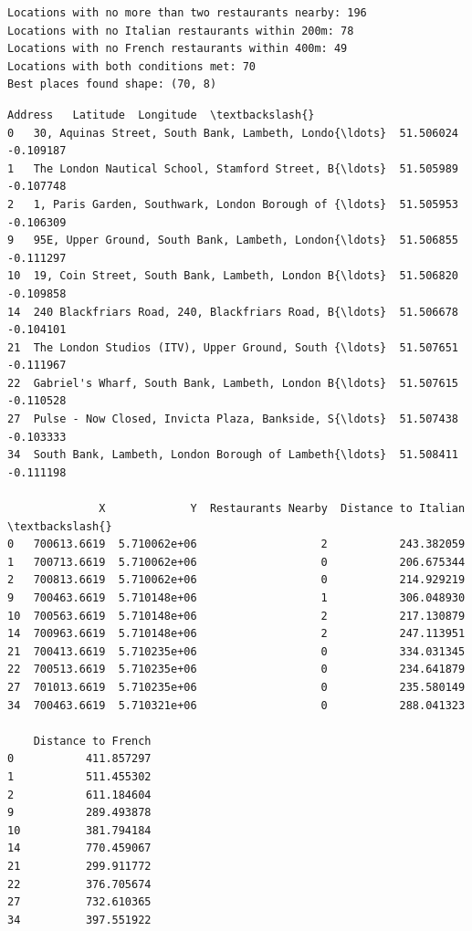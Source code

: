 \documentclass[11pt]{article}
\makeatletter
\newcommand{\boxspacing}{\kern\kvtcb@left@rule\kern\kvtcb@boxsep}
\newcommand{\prompt}[4]{
        \ttfamily\llap{{\color{#2}[#3]:\hspace{3pt}#4}}\vspace{-\baselineskip}
    }
\makeatother
\begin{document}
    \begin{Verbatim}[commandchars=\\\{\}]
Locations with no more than two restaurants nearby: 196
Locations with no Italian restaurants within 200m: 78
Locations with no French restaurants within 400m: 49
Locations with both conditions met: 70
Best places found shape: (70, 8)
    \end{Verbatim}

            \begin{tcolorbox}[breakable, size=fbox, boxrule=.5pt, pad at break*=1mm, opacityfill=0]
\prompt{Out}{outcolor}{93}{\boxspacing}
\begin{Verbatim}[commandchars=\\\{\}]
                                              Address   Latitude  Longitude  \textbackslash{}
0   30, Aquinas Street, South Bank, Lambeth, Londo{\ldots}  51.506024  -0.109187
1   The London Nautical School, Stamford Street, B{\ldots}  51.505989  -0.107748
2   1, Paris Garden, Southwark, London Borough of {\ldots}  51.505953  -0.106309
9   95E, Upper Ground, South Bank, Lambeth, London{\ldots}  51.506855  -0.111297
10  19, Coin Street, South Bank, Lambeth, London B{\ldots}  51.506820  -0.109858
14  240 Blackfriars Road, 240, Blackfriars Road, B{\ldots}  51.506678  -0.104101
21  The London Studios (ITV), Upper Ground, South {\ldots}  51.507651  -0.111967
22  Gabriel's Wharf, South Bank, Lambeth, London B{\ldots}  51.507615  -0.110528
27  Pulse - Now Closed, Invicta Plaza, Bankside, S{\ldots}  51.507438  -0.103333
34  South Bank, Lambeth, London Borough of Lambeth{\ldots}  51.508411  -0.111198

              X             Y  Restaurants Nearby  Distance to Italian  \textbackslash{}
0   700613.6619  5.710062e+06                   2           243.382059
1   700713.6619  5.710062e+06                   0           206.675344
2   700813.6619  5.710062e+06                   0           214.929219
9   700463.6619  5.710148e+06                   1           306.048930
10  700563.6619  5.710148e+06                   2           217.130879
14  700963.6619  5.710148e+06                   2           247.113951
21  700413.6619  5.710235e+06                   0           334.031345
22  700513.6619  5.710235e+06                   0           234.641879
27  701013.6619  5.710235e+06                   0           235.580149
34  700463.6619  5.710321e+06                   0           288.041323

    Distance to French
0           411.857297
1           511.455302
2           611.184604
9           289.493878
10          381.794184
14          770.459067
21          299.911772
22          376.705674
27          732.610365
34          397.551922
\end{Verbatim}
\end{tcolorbox}
        
\end{document}
